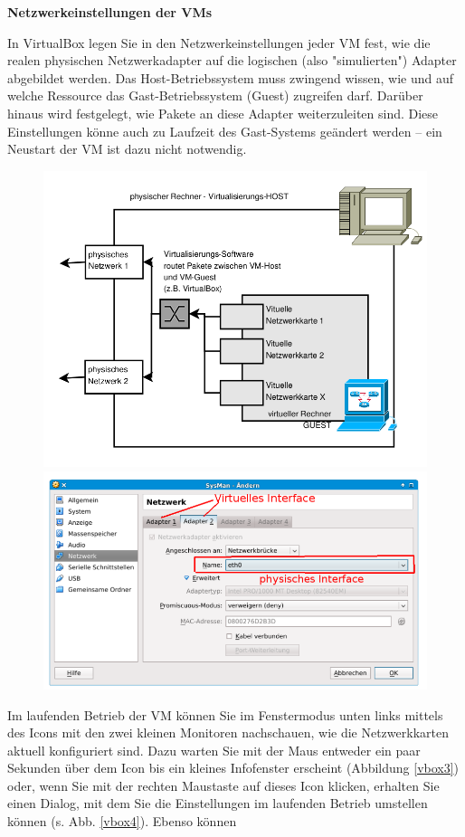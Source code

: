 \documentclass[paper=a4,fontsize=11pt]{scrartcl}%
\numberwithin{equation}{section}
\begin{document}
\begin{center}
\Large{\textbf{Netzwerkeinstellungen der VMs}}
\end{center}
In VirtualBox legen Sie in den Netzwerkeinstellungen jeder VM fest, wie die realen physischen Netzwerkadapter auf die logischen (also "simulierten") Adapter abgebildet werden. Das Host-Betriebssystem muss zwingend wissen, wie und auf welche Ressource das Gast-Betriebssystem (Guest) zugreifen darf. Darüber hinaus wird festgelegt, wie Pakete an diese Adapter weiterzuleiten sind. Diese Einstellungen könne auch zu Laufzeit des Gast-Systems geändert werden -- ein Neustart der VM ist dazu nicht notwendig.
\begin{figure}[H]
	\centering
	\includegraphics[scale=0.4]{vbox1}
	\includegraphics[scale=0.4]{vbox2}
\end{figure}
Im laufenden Betrieb der VM können Sie im Fenstermodus unten links mittels des Icons mit den zwei kleinen Monitoren nachschauen, wie die Netzwerkkarten aktuell konfiguriert sind. Dazu warten Sie mit der Maus entweder ein paar Sekunden über dem Icon bis ein kleines Infofenster erscheint (Abbildung \ref{vbox3}) oder, wenn Sie mit der rechten Maustaste auf dieses Icon klicken, erhalten Sie einen Dialog, mit dem Sie die Einstellungen im laufenden Betrieb umstellen können (s. Abb. \ref{vbox4}). Ebenso können 
\end{document}
